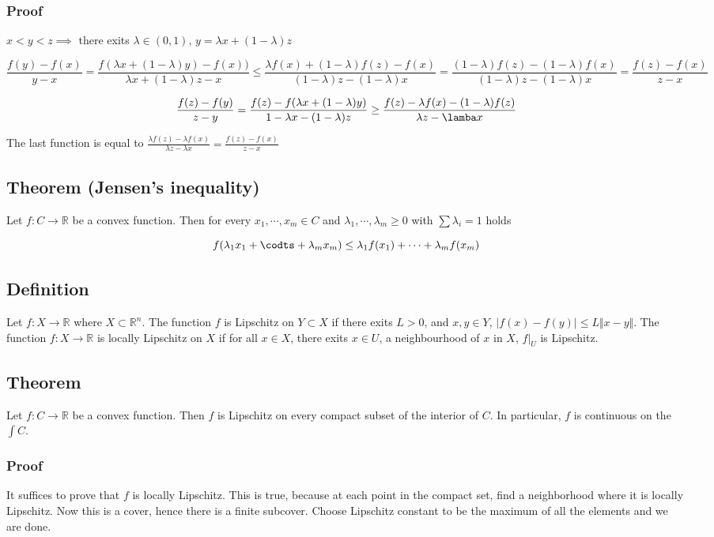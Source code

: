 \documentclass[11pt]{article}
\def\R{\mathbb{R}}
\begin{document}
\subsubsection{Proof}
\label{sec:orgb5e99fb}
\(x < y < z \implies\) there exits \(\lambda \in (0, 1)\), \(y = \lambda x + (1-\lambda)z\)

$$\frac{f(y) - f(x)}{y-x} = \frac{f(\lambda x + (1-\lambda)y) -
    f(x))}{\lambda x + (1-\lambda)z - x} \le \frac{\lambda f(x) + (1-\lambda)
    f(z) - f(x)}{(1-\lambda) z - (1-\lambda)x} = \frac{(1-\lambda)f(z) -
    (1-\lambda)f(x)}{(1-\lambda)z - (1-\lambda)x} = \frac{f(z) - f(x)}{z-x}$$

$$\frac{f(z) - f(y)}{z-y} = \frac{f(z) - f(\lambda x + (1-\lambda)
    y)}{1-\lambda x - (1-\lambda) z} \ge \frac{f(z) - \lambda f(x) -
    (1-\lambda)f(z)}{\lambda z - \lamba x}$$

The last function is equal to \(\frac{\lambda f(z) - \lambda f(x)}{\lambda
    z - \lambda x} = \frac{f(z) - f(x)}{z-x}\)
\subsection{Theorem (Jensen's inequality)}
\label{sec:org275e970}
Let \(f\colon C \rightarrow \R\) be a convex function. Then for every \(x_1,
   \cdots, x_m \in C\) and \(\lambda_1, \cdots, \lambda_m \ge 0\) with \(\sum
   \lambda_i = 1\) holds

$$f(\lambda_1 x_1 + \codts + \lambda_m x_m) \le \lambda_1 f(x_1) + \cdots +
   \lambda_m f(x_m)$$
\subsection{Definition}
\label{sec:org6f7c81b}
Let \(f\colon X \rightarrow \R\) where \(X \subset \R^n\). The function \(f\) is
Lipschitz on \(Y \subset X\) if there exits \(L > 0\), and \(x, y \in Y\), \(\vert
   f(x) - f(y) \vert \le L \Vert x - y \Vert\). The function \(f\colon X
   \rightarrow \R\) is locally Lipschitz on \(X\) if for all \(x\in X\), there exits
\(x\in U\), a neighbourhood of \(x\) in \(X\), \(f\vert_U\) is Lipschitz.
\subsection{Theorem}
\label{sec:orgd678b1d}
Let \(f\colon C\rightarrow \R\) be a convex function. Then \(f\) is Lipschitz on
every compact subset of the interior of \(C\). In particular, \(f\) is continuous
on the \(\int C\).
\subsubsection{Proof}
\label{sec:orgc660157}
It suffices to prove that \(f\) is locally Lipschitz. This is true, because at
each point in the compact set, find a neighborhood where it is locally
Lipschitz. Now this is a cover, hence there is a finite subcover. Choose
Lipschitz constant to be the maximum of all the elements and we are done.
\end{document}
